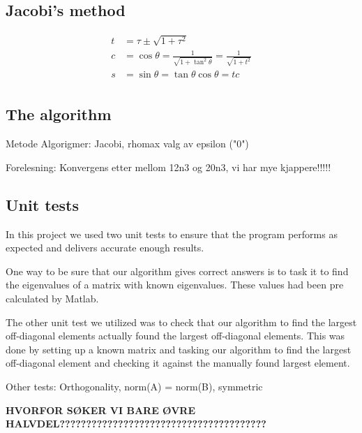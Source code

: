 \subsection{Jacobi's method}

\begin{align*}
t &= \tau \pm \sqrt{1+\tau^2}\\ 
c &= \cos \theta = \frac{1}{\sqrt{1+\tan^2\theta}} = \frac{1}{\sqrt{1+t^2}}\\
s &= \sin \theta = \tan \theta \cos \theta = t c\\
\end{align*}

\subsection{The algorithm}



	Metode
Algorigmer: Jacobi, rhomax
valg av epsilon ("0")

Forelesning: Konvergens etter mellom 12n3 og 20n3, vi har mye kjappere!!!!!


\subsection{Unit tests}

In this project we used two unit tests to ensure that the program performs as expected and delivers accurate enough results. 

One way to be sure that our algorithm gives correct answers is to task it to find the eigenvalues of a matrix with known eigenvalues. These values had been pre calculated by Matlab. 

The other unit test we utilized was to check that our algorithm to find the largest off-diagonal elements actually found the largest off-diagonal elements. This was done by setting up a known matrix and tasking our algorithm to find the largest off-diagonal element and checking it against the manually found largest element. 




Other tests: Orthogonality, norm(A) = norm(B), symmetric


\textbf{HVORFOR SØKER VI BARE ØVRE HALVDEL???????????????????????????????????????}